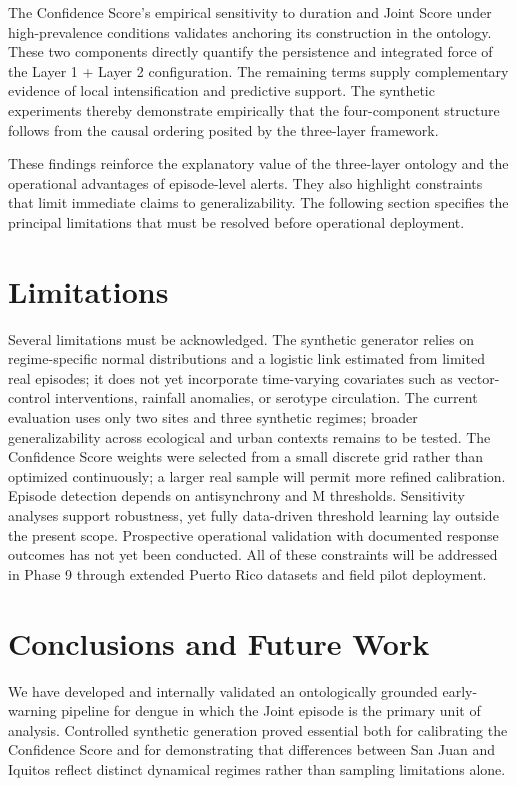 \documentclass[11pt,a4paper]{article}
\begin{document}
The Confidence Score's empirical sensitivity to duration and Joint Score under high-prevalence conditions validates anchoring its construction in the ontology. These two components directly quantify the persistence and integrated force of the Layer 1 + Layer 2 configuration. The remaining terms supply complementary evidence of local intensification and predictive support. The synthetic experiments thereby demonstrate empirically that the four-component structure follows from the causal ordering posited by the three-layer framework.

These findings reinforce the explanatory value of the three-layer ontology and the operational advantages of episode-level alerts. They also highlight constraints that limit immediate claims to generalizability. The following section specifies the principal limitations that must be resolved before operational deployment.

\section{Limitations}

Several limitations must be acknowledged. The synthetic generator relies on regime-specific normal distributions and a logistic link estimated from limited real episodes; it does not yet incorporate time-varying covariates such as vector-control interventions, rainfall anomalies, or serotype circulation. The current evaluation uses only two sites and three synthetic regimes; broader generalizability across ecological and urban contexts remains to be tested. The Confidence Score weights were selected from a small discrete grid rather than optimized continuously; a larger real sample will permit more refined calibration. Episode detection depends on antisynchrony and M thresholds. Sensitivity analyses support robustness, yet fully data-driven threshold learning lay outside the present scope. Prospective operational validation with documented response outcomes has not yet been conducted. All of these constraints will be addressed in Phase 9 through extended Puerto Rico datasets and field pilot deployment.

\section{Conclusions and Future Work}

We have developed and internally validated an ontologically grounded early-warning pipeline for dengue in which the Joint episode is the primary unit of analysis. Controlled synthetic generation proved essential both for calibrating the Confidence Score and for demonstrating that differences between San Juan and Iquitos reflect distinct dynamical regimes rather than sampling limitations alone.
\end{document}
